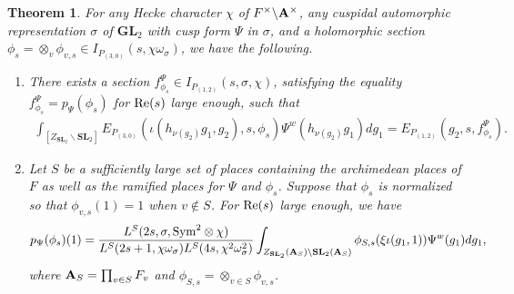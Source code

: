 \documentclass[11pt, reqno]{amsart}
\theoremstyle{plain}
\newtheorem{theorem}{Theorem}[section]
\theoremstyle{definition}
\theoremstyle{remark}
\theoremstyle{plain}
\def\SL{{\mathbf{SL}}}
\def\A{{\bf A}}
\def\GL{\mathbf{GL}}
\begin{document}
\begin{theorem}\label{PullbackFormulaNew} For any Hecke character $\chi$ of $F^\times \backslash \A^\times$, any cuspidal automorphic representation $\sigma$ of $\GL_2$ with cusp form $\Psi$ in $\sigma$, and a holomorphic section $\phi_s = \otimes_v \phi_{v,s} \in I_{P_{(3,0)}}(s,\chi \omega_\sigma)$, we have the following. \begin{enumerate}
    \item  There exists a section $f^{\Psi}_{\phi_s}\in I_{P_{(1,2)}}(s,\sigma,\chi)$, satisfying the equality $f^{\Psi}_{\phi_s} = p_{\Psi}(\phi_s)$ for ${\rm Re}(s)$ large enough, such that 
    \begin{align}\label{eq:basic_pullback}
        \int_{[Z_{\SL_2}\backslash \SL_2]} E_{P_{(3,0)}}(\iota( h_{\nu(g_2)} g_1  , g_2), s,\phi_s) \Psi^w( h_{\nu(g_2)} g_1  ) d g_1 = E_{P_{(1,2)}}(g_2,s,f^{\Psi}_{\phi_s}).
    \end{align}  
    \item  Let $S$ be a sufficiently large set of places containing the archimedean places of $F$ as well as the ramified places for $\Psi$ and $\phi_s$.  Suppose that $\phi_s$ is normalized so that $\phi_{v,s}(1)=1$ when $v \not \in S$. For ${\rm Re}(s)$ large enough, we have 
    \[ p_\Psi(\phi_s)(1) = \frac{L^S(2s,\sigma ,\mathrm{Sym}^2\otimes \chi)}{L^S(2s+1,\chi\omega_{\sigma})L^S(4s,\chi^2\omega_{\sigma}^2)} \int_{Z_{\SL_2}(\A_S)\backslash \SL_2(\A_S)}\phi_{S,s}(\xi\iota( g_1,1))\Psi^w(g_1)dg_1, \]
where $\A_S = \prod_{v \in S} F_v$ and $\phi_{S,s} = \otimes_{v \in S} \phi_{v,s}$. 
\end{enumerate}
\end{theorem}
\end{document}
